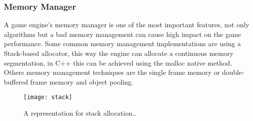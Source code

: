 \subsubsection{Memory Manager}
A game engine's memory manager is one of the most important features, not only algorithms but a bad memory management can cause high impact on the game performance\cite{GameEngineArchitecture}. Some common memory management implementations are using a Stack-based allocator, this way the engine can allocate a continuous memory segmentation, in C++ this can be achieved using the malloc native method\cite{GameEngineArchitecture, Malloc}. Others memory management techniques are the single frame memory or double-buffered frame memory and object pooling\cite{GameEngineArchitecture, MemoryAllocationPatternsUsedInGameDevelopment}.

\begin{figure}[!h] \centering \texttt{[image: stack]} \caption{A representation for stack allocation.\cite{GameEngineArchitecture}.} \label{fig:memory-stack} \end{figure}